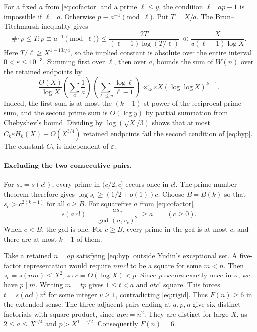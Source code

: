 \documentclass[10pt,letterpaper]{article}
\begin{document}
For a fixed \(a\) from \eqref{eq:cofactor} and a prime \(\ell\le y\), the condition \(\ell\mid ap-1\) is impossible if \(\ell\mid a\). Otherwise \(p\equiv a^{-1}\pmod\ell\). Put \(T=X/a\). The Brun--Titchmarsh inequality \cite[Theorem~2]{mv} gives
\[
 \#\{p\le T:p\equiv a^{-1}\pmod\ell\}
 \le \frac{2T}{(\ell-1)\log(T/\ell)}
 \ll \frac{X}{a(\ell-1)\log X}.
\]
Here \(T/\ell\ge X^{1-13\varepsilon/4}\), so the implied constant is absolute over the entire interval \(0<\varepsilon\le10^{-3}\). Summing first over \(\ell\), then over \(a\), bounds the sum of \(W(n)\) over the retained endpoints by
\[
 \frac{O(X)}{\log X}
 \left(\sum_{a}\frac1a\right)
 \left(\sum_{\ell\le y}\frac{\log\ell}{\ell-1}\right)
 \ll_k \varepsilon X(\log\log X)^{k-1}.
\]
Indeed, the first sum is at most the \((k-1)\)-st power of the reciprocal-prime sum, and the second prime sum is \(O(\log y)\) by partial summation from Chebyshev's bound. Dividing by \(\log(\sqrt X/3)\) shows that at most \(C_k\varepsilon H_k(X)+O(X^{3/4})\) retained endpoints fail the second condition of \eqref{eq:hyp}. The constant \(C_k\) is independent of \(\varepsilon\).

\paragraph{Excluding the two consecutive pairs.}
For \(s_c=s(c!)\), every prime in \((c/2,c]\) occurs once in \(c!\). The prime number theorem therefore gives \(\log s_c\ge(1/2+o(1))c\). Choose \(B=B(k)\) so that \(s_c>c^{2(k-1)}\) for all \(c\ge B\). For squarefree \(a\) from \eqref{eq:cofactor},
\[
 s(a\,c!)=\frac{a s_c}{\gcd(a,s_c)^2}\ \ge a\qquad(c\ge0).
 \tag{3}\label{eq:rigid}
\]
When \(c<B\), the gcd is one. For \(c\ge B\), every prime in the gcd is at most \(c\), and there are at most \(k-1\) of them.

Take a retained \(n=ap\) satisfying \eqref{eq:hyp} outside Yudin's exceptional set. A five-factor representation would require \(nm c!\) to be a square for some \(m<n\). Then \(s_c=s(nm)\le X^2\), so \(c=O(\log X)<p\). Since \(p\) occurs exactly once in \(n\), we have \(p\mid m\). Writing \(m=tp\) gives \(1\le t<a\) and \(a t c!\) square. This forces \(t=s(a c!)v^2\) for some integer \(v\ge1\), contradicting \eqref{eq:rigid}. Thus \(F(n)\ge6\) in the extended sense. The three adjacent pairs ending at \(a,p,n\) give six distinct factorials with square product, since \(apn=n^2\). They are distinct for large \(X\), as \(2\le a\le X^{\varepsilon/4}\) and \(p>X^{1-\varepsilon/2}\). Consequently \(F(n)=6\).
\end{document}
